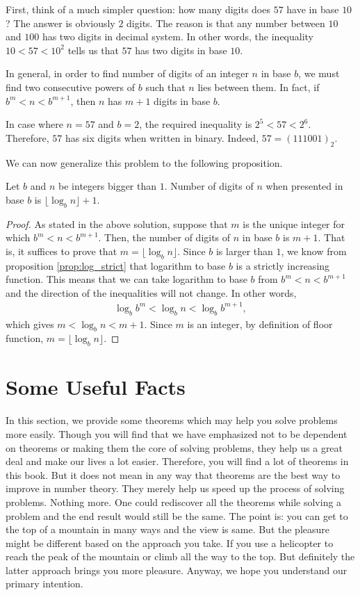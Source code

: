 \documentclass{subfile}
\begin{document}
	\begin{solution}
		First, think of a much simpler question: how many digits does $57$ have in base $10$? The answer is obviously $2$ digits. The reason is that any number between $10$ and $100$ has two digits in decimal system. In other words, the inequality $10<57<10^2$ tells us that $57$ has two digits in base $10$.

		In general, in order to find number of digits of an integer $n$ in base $b$, we must find two consecutive powers of $b$ such that $n$ lies between them. In fact, if $b^m < n <b^{m+1}$, then $n$ has $m+1$ digits in base $b$.

		In case where $n=57$ and $b=2$, the required inequality is $2^5 < 57 <2^6$. Therefore, $57$ has six digits when written in binary. Indeed, $57 = (111001)_2$.
	\end{solution}
	We can now generalize this problem to the following proposition.
	\begin{proposition}
		Let $b$ and $n$ be integers bigger than $1$. Number of digits of $n$ when presented in base $b$ is $\lfloor \log_b n\rfloor +1$.
	\end{proposition}

	\begin{proof}
		As stated in the above solution, suppose that $m$ is the unique integer for which $b^m < n <b^{m+1}$. Then, the number of digits of $n$ in base $b$ is $m+1$. That is, it suffices to prove that $m=\lfloor \log_b n\rfloor$. Since $b$ is larger than $1$, we know from proposition \eqref{prop:log_strict} that logarithm to base $b$ is a strictly increasing function. This means that we can take logarithm to base $b$ from $b^m < n <b^{m+1}$ and the direction of the inequalities will not change. In other words,
		\begin{align*}
		\log_b b^m < \log_b n < \log_b b^{m+1},
		\end{align*}
		which gives $m<\log_b n<m+1$. Since $m$ is an integer, by definition of floor function, $m=\lfloor \log_b n \rfloor$.
	\end{proof}
	\section{Some Useful Facts}\label{sec:theoremsindiv}
	In this section, we provide some theorems which may help you solve problems more easily. Though you will find that we have emphasized not to be dependent on theorems or making them the core of solving problems, they help us a great deal and make our lives a lot easier. Therefore, you will find a lot of theorems in this book. But it does not mean in any way that theorems are the best way to improve in number theory. They merely help us speed up the process of solving problems. Nothing more. One could rediscover all the theorems while solving a problem and the end result would still be the same. The point is: you can get to the top of a mountain in many ways and the view is same. But the pleasure might be different based on the approach you take. If you use a helicopter to reach the peak of the mountain or climb all the way to the top. But definitely the latter approach brings you more pleasure. Anyway, we hope you understand our primary intention.
\end{document}
